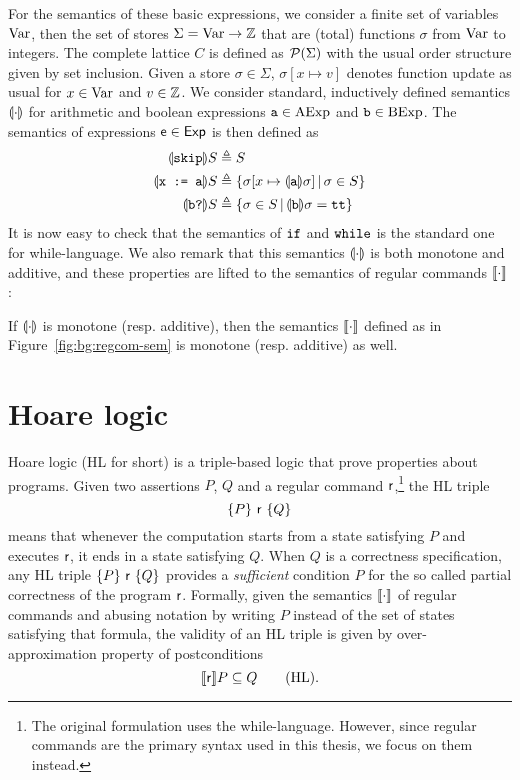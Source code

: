For the semantics of these basic expressions, we consider a finite set of variables $\text{Var}$, then the set of stores $\Sigma = \text{Var} \rightarrow \mathbb{Z}$ that are (total) functions $\sigma$ from $\text{Var}$ to integers. The complete lattice $C$ is defined as $\mathcal{P}(\Sigma)$ with the usual order structure given by set inclusion. Given a store $\sigma \in \Sigma$, $\sigma[ x \mapsto v ]$ denotes function update as usual for $x \in \text{Var}$ and $v \in \mathbb{Z}$. We consider standard, inductively defined semantics $\llparenthesis\cdot\rrparenthesis$ for arithmetic and boolean expressions $\texttt{a} \in \text{AExp}$ and $\texttt{b} \in \text{BExp}$. The semantics of expressions $\mathsf{e} \in \mathsf{Exp}$ is then defined as
\begin{align*}
	\llparenthesis\texttt{skip}\rrparenthesis S   & \triangleq S                                                                                         \\
	\llparenthesis\texttt{x := a}\rrparenthesis S & \triangleq \left\lbrace \sigma[x \mapsto \llparenthesis\texttt{a}\rrparenthesis \sigma] \,\vert\, \sigma \in S \right\rbrace \\
	\llparenthesis\texttt{b?}\rrparenthesis S     & \triangleq \left\lbrace \sigma \in S \,\vert\, \llparenthesis\texttt{b}\rrparenthesis \sigma = \texttt{tt} \right\rbrace
\end{align*}
It is now easy to check that the semantics of $\texttt{if}$ and $\texttt{while}$ is the standard one for while-language. We also remark that this semantics $\llparenthesis\cdot\rrparenthesis$ is both monotone and additive, and these properties are lifted to the semantics of regular commands $\llbracket\cdot\rrbracket$:
\begin{prop}
	If $\llparenthesis\cdot\rrparenthesis$ is monotone (resp. additive), then the semantics $\llbracket\cdot\rrbracket$ defined as in Figure~\ref{fig:bg:regcom-sem} is monotone (resp. additive) as well.
\end{prop}

\section{Hoare logic}\label{sec:bg:hl}
Hoare logic (HL for short) \cite{Hoare69} is a triple-based logic that prove properties about programs. Given two assertions $P$, $Q$ and a regular command $\mathsf{r}$,\footnote{The original formulation uses the while-language. However, since regular commands are the primary syntax used in this thesis, we focus on them instead.} the HL triple
\[
\{P\}~\mathsf{r}~\{Q\}
\]
means that whenever the computation starts from a state satisfying $P$ and executes $\mathsf{r}$, it ends in a state satisfying $Q$.
When $Q$ is a correctness specification, any HL triple $\{P\}~\mathsf{r}~\{Q\}$ provides a \emph{sufficient} condition $P$ for the so called partial correctness of the program $\mathsf{r}$.
Formally, given the semantics $\llbracket\cdot\rrbracket$ of regular commands and abusing notation by writing $P$ instead of the set of states satisfying that formula, the validity of an HL triple is given by over-approximation property of postconditions
\[
\llbracket\mathsf{r}\rrbracket P \subseteq Q \tag{HL}\label{eq:bg:hl-validity}.
\]

